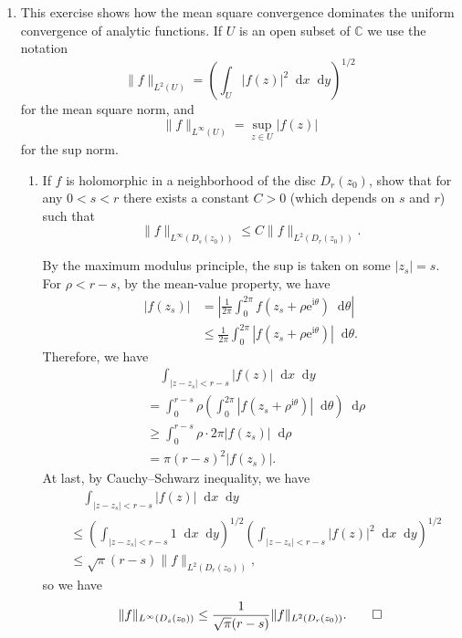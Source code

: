 \documentclass[11pt]{report}
\theoremstyle{mythm}
\let\oldendproof\endproof
\renewenvironment{proof}[1][\proofname]{%
  \oldproof[\normalfont \bfseries #1]%
}{\oldendproof}
\renewcommand*{\proofname}{Proof}
\theoremstyle{myans}
\newcommand{\mi}{\mathrm{i}}
\newcommand{\me}{\mathrm{e}}
\newcommand{\dd}{\mathop{}\!\mathrm{d}}
\newcommand{\bbC}{\mathbb{C}}
\newcommand{\norm}[1]{\|#1\|}
\begin{document}
\begin{enumerate}
\begin{enumerate}
\begin{proof}
    \end{proof}
  \end{enumerate}
  \setcounter{enumi}{19}
  \item This exercise shows how the mean square convergence dominates the uniform convergence of analytic
  functions. If $U$ is an open subset of $\bbC$ we use the notation
  \[ \norm{f}_{L^2(U)} = \left(\int_U |f(z)|^2 \dd x\dd y\right)^{1/2} \]
  for the mean square norm, and
  \[ \norm{f}_{L^\infty(U)} = \sup_{z\in U} |f(z)| \]
  for the sup norm.
  \begin{enumerate}
    \item If $f$ is holomorphic in a neighborhood of the disc $D_r(z_0)$, show that for any $0<s<r$
    there exists a constant $C>0$ (which depends on $s$ and $r$) such that
    \[ \norm{f}_{L^\infty(D_s(z_0))} \leq C \norm{f}_{L^2(D_r(z_0))}. \]
    \begin{proof}
      By the maximum modulus principle, the sup is taken on some $|z_s|=s$. For $\rho < r-s$, by the mean-value
      property, we have
      \begin{align*}
        |f(z_s)| &= \left|\frac 1{2\pi} \int_0^{2\pi} f(z_s + \rho \me^{\mi \theta})\dd \theta \right|\\
        &\leq \frac 1{2\pi} \int_0^{2\pi} |f(z_s+\rho \me^{\mi \theta})| \dd \theta.
      \end{align*}
      Therefore, we have
      \begin{align*}
        &\quad \int_{|z-z_s|< r-s} |f(z)| \dd x\dd y\\
        &= \int_{0}^{r-s} \rho \left(\int_0^{2\pi}|f(z_s+\rho^{\mi \theta})| \dd \theta\right)\dd \rho\\
        &\geq \int_{0}^{r-s} \rho \cdot 2\pi |f(z_s)|\dd \rho\\
        &= \pi (r-s)^2 |f(z_s)|.
      \end{align*}
      At last, by Cauchy--Schwarz inequality, we have
      \begin{align*}
        &\quad \int_{|z-z_s|< r-s} |f(z)| \dd x\dd y\\
        &\leq \left(\int_{|z-z_s|< r-s} 1 \dd x\dd y\right)^{1/2}\left(\int_{|z-z_s|< r-s} |f(z)|^2 \dd x\dd y\right)^{1/2}\\
        &\leq \sqrt{\pi} (r-s) \norm{f}_{L^2(D_r(z_0))},
      \end{align*}
      so we have
      \[ \norm{f}_{L^\infty(D_s(z_0))}\leq \frac{1}{\sqrt{\pi}(r-s)} \norm{f}_{L^2(D_r(z_0))}.\qedhere \]
    \end{proof}

\end{enumerate}
\end{enumerate}
\end{document}
